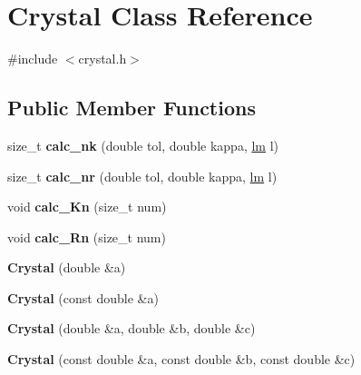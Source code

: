 \hypertarget{classCrystal}{}\section{Crystal Class Reference}
\label{classCrystal}


{\ttfamily \#include $<$crystal.\+h$>$}

\subsection*{Public Member Functions}
\begin{DoxyCompactItemize}
\item 
\mbox{\label{classCrystal_af60ff2a10146e75a52e6df02c54f35d9}} 
size\+\_\+t {\bfseries calc\+\_\+nk} (double tol, double kappa, \hyperlink{structlm}{lm} l)
\item 
\mbox{\label{classCrystal_af1c7ecea434e2fd23179c31f4dc293ab}} 
size\+\_\+t {\bfseries calc\+\_\+nr} (double tol, double kappa, \hyperlink{structlm}{lm} l)
\item 
\mbox{\label{classCrystal_a7d5661dea0deafd0ec6c9e473fc64903}} 
void {\bfseries calc\+\_\+\+Kn} (size\+\_\+t num)
\item 
\mbox{\label{classCrystal_a49ec1aa8a9072ed17bd2fe72fa1a17f5}} 
void {\bfseries calc\+\_\+\+Rn} (size\+\_\+t num)
\item 
\mbox{\label{classCrystal_a48b64a146c0a7d5c535d9810f9a4db0f}} 
{\bfseries Crystal} (double \&a)
\item 
\mbox{\label{classCrystal_a833d7b176886858f4c60783e8a206fca}} 
{\bfseries Crystal} (const double \&a)
\item 
\mbox{\label{classCrystal_ad3d2d5e6685320d29315645218d9ef3e}} 
{\bfseries Crystal} (double \&a, double \&b, double \&c)
\item 
\mbox{\label{classCrystal_a7fbd1876776468459c219f3f2682151a}} 
{\bfseries Crystal} (const double \&a, const double \&b, const double \&c)
\item 
\mbox{\label{classCrystal_a8ce1dcbea5d7044e7c76036539e457ef}} 

\end{DoxyCompactItemize}
